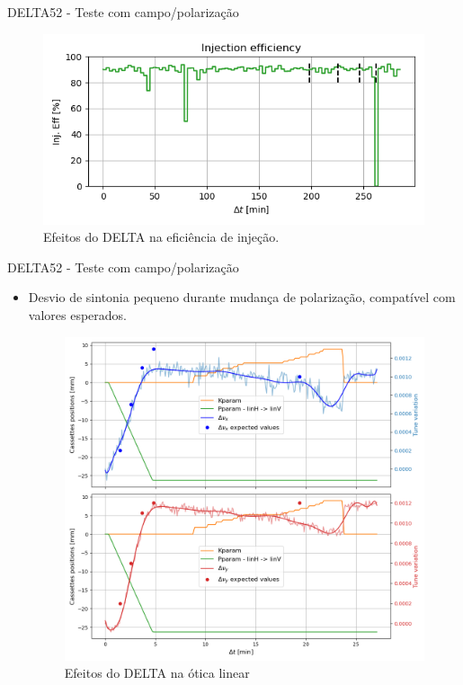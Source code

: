 \documentclass{beamer}					  %
\begin{document}
\begin{frame}{DELTA52 - Teste com campo/polarização}
            \begin{figure}[H]
    		\centering
            \includegraphics[width=1\textwidth]{2023-11-17/figures/inj_eff.png}
            \caption{Efeitos do DELTA na eficiência de injeção.}
            \label{fig:inj_eff}
    \end{figure}
\end{frame}

\begin{frame}{DELTA52 - Teste com campo/polarização}
    \begin{itemize}
            \item Desvio de sintonia pequeno durante mudança de polarização, compatível com valores esperados.
            \begin{figure}[H]
    		\centering
            \includegraphics[width=.7\textwidth]{2023-11-17/figures/tune_linh_linv.png}
            \caption{Efeitos do DELTA na ótica linear}
            \label{fig:linh_linv}
        \end{figure}
    \end{itemize}
\end{frame}
\end{document}
